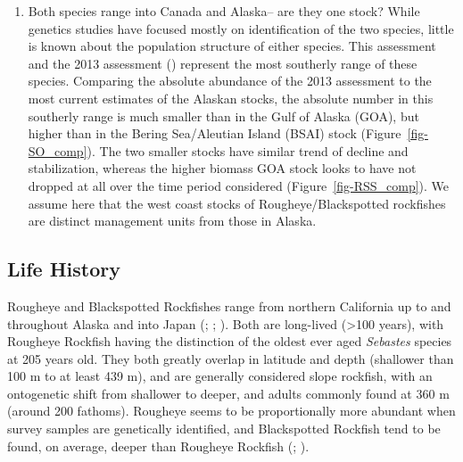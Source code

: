 \documentclass[
]{scrartcl}
\providecommand{\tightlist}{%
  \setlength{\itemsep}{0pt}\setlength{\parskip}{0pt}}\usepackage{longtable,booktabs,array}
\begin{document}
\begin{enumerate}
\def\labelenumi{\arabic{enumi}.}
\setcounter{enumi}{1}
\tightlist
\item
  Both species range into Canada and Alaska-- are they one stock? While
  genetics studies have focused mostly on identification of the two
  species, little is known about the population structure of either
  species. This assessment and the 2013 assessment
  ()
  represent the most southerly range of these species. Comparing the
  absolute abundance of the 2013 assessment to the most current
  estimates of the Alaskan stocks, the absolute number in this southerly
  range is much smaller than in the Gulf of Alaska (GOA), but higher
  than in the Bering Sea/Aleutian Island (BSAI) stock
  (Figure~\ref{fig-SO_comp}). The two smaller stocks have similar trend
  of decline and stabilization, whereas the higher biomass GOA stock
  looks to have not dropped at all over the time period considered
  (Figure~\ref{fig-RSS_comp}). We assume here that the west coast stocks
  of Rougheye/Blackspotted rockfishes are distinct management units from
  those in Alaska.
\end{enumerate}

\subsection{Life History}\label{life-history}

Rougheye and Blackspotted Rockfishes range from northern California up
to and throughout Alaska and into Japan
(;
;
). Both are
long-lived (\textgreater100 years), with Rougheye Rockfish having the
distinction of the oldest ever aged \emph{Sebastes} species at 205 years
old. They both greatly overlap in latitude and depth (shallower than 100
m to at least 439 m), and are generally considered slope rockfish, with
an ontogenetic shift from shallower to deeper, and adults commonly found
at 360 m (around 200 fathoms). Rougheye seems to be proportionally more
abundant when survey samples are genetically identified, and
Blackspotted Rockfish tend to be found, on average, deeper than Rougheye
Rockfish (; ).
\end{document}
